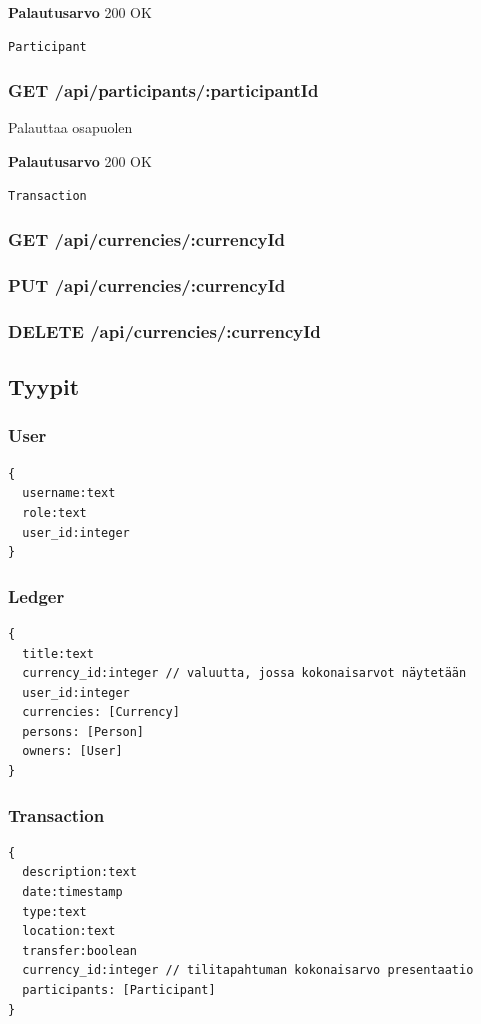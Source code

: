 \documentclass[a4paper,parskip=half]{scrartcl}
\begin{document}
\textbf{Palautusarvo}
200 OK
\begin{Verbatim}
Participant
\end{Verbatim}

\subsubsection{GET /api/participants/:participantId}

Palauttaa osapuolen

\textbf{Palautusarvo}
200 OK
\begin{Verbatim}
Transaction
\end{Verbatim}

\subsubsection{GET /api/currencies/:currencyId}

\subsubsection{PUT /api/currencies/:currencyId}

\subsubsection{DELETE /api/currencies/:currencyId}

\subsection{Tyypit}

\subsubsection{User}
\begin{Verbatim}
{
  username:text
  role:text
  user_id:integer
}
\end{Verbatim}

\subsubsection{Ledger}
\begin{Verbatim}
{
  title:text
  currency_id:integer // valuutta, jossa kokonaisarvot näytetään
  user_id:integer
  currencies: [Currency]
  persons: [Person]
  owners: [User]
}
\end{Verbatim}

\subsubsection{Transaction}
\begin{Verbatim}
{
  description:text
  date:timestamp
  type:text
  location:text
  transfer:boolean
  currency_id:integer // tilitapahtuman kokonaisarvo presentaatio
  participants: [Participant]
}
\end{Verbatim}
\end{document}
